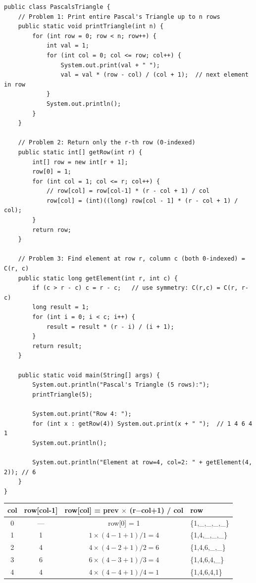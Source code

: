 \documentclass[12pt,a4paper,oneside]{book}
\begin{document}
\begin{lstlisting}[caption={Print Pascal's Triangle --- n rows}]
public class PascalsTriangle {
    // Problem 1: Print entire Pascal's Triangle up to n rows
    public static void printTriangle(int n) {
        for (int row = 0; row < n; row++) {
            int val = 1;
            for (int col = 0; col <= row; col++) {
                System.out.print(val + " ");
                val = val * (row - col) / (col + 1);  // next element in row
            }
            System.out.println();
        }
    }

    // Problem 2: Return only the r-th row (0-indexed)
    public static int[] getRow(int r) {
        int[] row = new int[r + 1];
        row[0] = 1;
        for (int col = 1; col <= r; col++) {
            // row[col] = row[col-1] * (r - col + 1) / col
            row[col] = (int)((long) row[col - 1] * (r - col + 1) / col);
        }
        return row;
    }

    // Problem 3: Find element at row r, column c (both 0-indexed) = C(r, c)
    public static long getElement(int r, int c) {
        if (c > r - c) c = r - c;   // use symmetry: C(r,c) = C(r, r-c)
        long result = 1;
        for (int i = 0; i < c; i++) {
            result = result * (r - i) / (i + 1);
        }
        return result;
    }

    public static void main(String[] args) {
        System.out.println("Pascal's Triangle (5 rows):");
        printTriangle(5);

        System.out.print("Row 4: ");
        for (int x : getRow(4)) System.out.print(x + " ");  // 1 4 6 4 1
        System.out.println();

        System.out.println("Element at row=4, col=2: " + getElement(4, 2)); // 6
    }
}
\end{lstlisting}

\begin{dryrun}[Dry Run: getRow(4) --- row index 4 = \{1, 4, 6, 4, 1\}]
\begin{center}
\begin{tabular}{cccl}
\toprule
\textbf{col} & \textbf{row[col-1]} & \textbf{row[col] = prev $\times$ (r$-$col+1) / col} & \textbf{row}\\
\midrule
0 & ---& row[0] = 1                        & \{1,\_,\_,\_,\_\}\\
1 & 1  & $1 \times (4-1+1)/1 = 4$          & \{1,4,\_,\_,\_\}\\
2 & 4  & $4 \times (4-2+1)/2 = 6$          & \{1,4,6,\_,\_\}\\
3 & 6  & $6 \times (4-3+1)/3 = 4$          & \{1,4,6,4,\_\}\\
4 & 4  & $4 \times (4-4+1)/4 = 1$          & \{1,4,6,4,1\}\\
\bottomrule
\end{tabular}
\end{center}
\end{dryrun}
\end{document}
